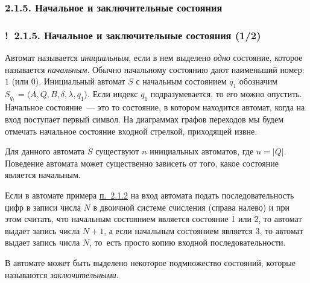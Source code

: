 \documentclass[mathserif,12pt,aspectratio=169]{beamer}
\def\emразделенной{\em разделенной}
\renewcommand{\index}[1]{}
\def\em#1{\it\color{blue}#1}
\def\odmkey#1#2{{\it\color{red} #1}\index{#2}}
\def\DMref#1#2{{\color{blue}\underline{\hyperlink{#2}{#1}}}}
\def\Ok{{\color{green}\textbf{!}\ }}
\begin{document}
\subsubsection{2.1.5. Начальное и заключительные состояния}\label{2.1.5.}
\begin{frame}
\frametitle{\Ok 2.1.5. Начальное и заключительные состояния (1/2)}

Автомат называется \odmkey{инициальным}{Автомат!инициальный}, если
в нем выделено {\em одно} состояние, которое называется
\odmkey{начальным}{Состояние!начальное}. Обычно начальному
состоянию дают наименьший номер: $1$ (или 0). Инициальный автомат
$S$ с начальным состоянием $q_1$ обозначим $S_{q_1}=\langle A, Q,
B, \delta, \lambda, q_1\rangle$. Если индекс $q_1$
подразумевается, то его можно опустить. Начальное состояние~---
это то состояние, в котором находится автомат, когда на вход
поступает первый символ. На диаграммах графов переходов мы будем
отмечать начальное состояние входной стрелкой, приходящей
извне.

Для данного автомата $S$ существуют $n$ инициальных автоматов, где
$n=|Q|$. Поведение автомата может существенно зависеть от того,
какое состояние является начальным.

\begin{example}
Если в автомате примера \DMref{п.~2.1.2}{2.1.2.} на вход автомата подать
последовательность цифр в записи числа $N$ в двоичной системе
счисления (справа налево) и при этом считать, что начальным
состоянием является состояние 1 или 2, то автомат выдает запись
числа $N+1$, а если начальным состоянием является 3, то автомат
выдает запись числа $N$, то~есть просто копию входной
последовательности.
\end{example}

В автомате может быть выделено некоторое подмножество состояний,
которые называются
\odmkey{заключительными}{Состояние!заключительное}. 
\end{frame}
\end{document}
